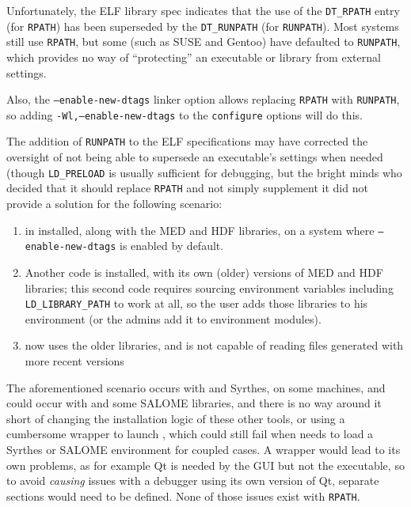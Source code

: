 \documentclass[a4paper,10pt,twoside]{csshortdoc}
\begin{document}
Unfortunately, the ELF library spec indicates that the use of the
\texttt{DT\_RPATH} entry (for \texttt{RPATH}) has been superseded by the
\texttt{DT\_RUNPATH} (for \texttt{RUNPATH}). Most systems still use
\texttt{RPATH}, but some (such as SUSE and Gentoo) have defaulted to
\texttt{RUNPATH}, which provides no way of ``protecting'' an executable
or library from external settings.

Also, the \texttt{--enable-new-dtags} linker option allows replacing
\texttt{RPATH} with \texttt{RUNPATH}, so adding \texttt{-Wl,--enable-new-dtags}
to the {\tt configure} options will do this.

The addition of \texttt{RUNPATH} to the ELF specifications may have
corrected the oversight of not being able to supersede an executable's
settings when needed (though \texttt{LD\_PRELOAD} is usually sufficient
for debugging, but the bright minds who decided that it should
replace \texttt{RPATH} and not simply supplement it did not provide
a solution for the following scenario:

\begin{enumerate}
\item \CS in installed, along with the MED and HDF libraries,
       on a system where \texttt{--enable-new-dtags} is enabled by default.
\item Another code is installed, with its own (older) versions of MED and HDF
      libraries; this second code requires sourcing environment variables
      including \texttt{LD\_LIBRARY\_PATH} to work at all, so the user
      adds those libraries to his environment (or the admins add it to
      environment modules).
\item \CS now uses the older libraries, and is not capable of reading
      files generated with more recent versions
\end{enumerate}

The aforementioned scenario occurs with \CS and Syrthes, on some
machines, and could occur with \CS and some SALOME libraries, and there is
no way around it short of changing the installation logic of these other tools,
or using a cumbersome wrapper to launch \CS, which could still fail when
\CS needs to load a Syrthes or SALOME environment for coupled cases.
A wrapper would lead to its own problems, as for example Qt is needed
by the GUI but not the executable, so to avoid \emph{causing} issues with
a debugger using its own version of Qt, separate sections would need
to be defined. None of those issues exist with \texttt{RPATH}.
\end{document}

